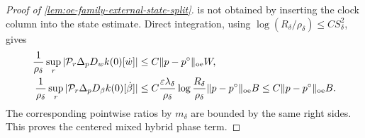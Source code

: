 \begin{proof}[Proof of
\cref{lem:oe-family-external-state-split}]
is not obtained by inserting the clock column into the state estimate.
Direct integration, using
\(\log(R_\delta/\rho_\delta)\le CS_\delta^2\), gives
\begin{align}
 \frac1{\rho_\delta}\sup_r
   |\mathcal P_r\Delta_pD_wk(0)[\dot w]|
 &\le C\|p-p^\circ\|_{\rm oe}W,\notag\\
 \frac1{\rho_\delta}\sup_r
   |\mathcal P_r\Delta_pD_\beta k(0)[\dot\beta]|
 &\le C\frac{\varepsilon\lambda_\delta}{\rho_\delta}
       \log\frac{R_\delta}{\rho_\delta}
       \|p-p^\circ\|_{\rm oe}B
 \le C\|p-p^\circ\|_{\rm oe}B.                \label{eq:proof-oe-family-mixed-phase-prefix}
\end{align}
The corresponding pointwise ratios by \(m_\delta\) are bounded by the
same right sides.  This proves the centered mixed hybrid phase term.


\end{proof}
